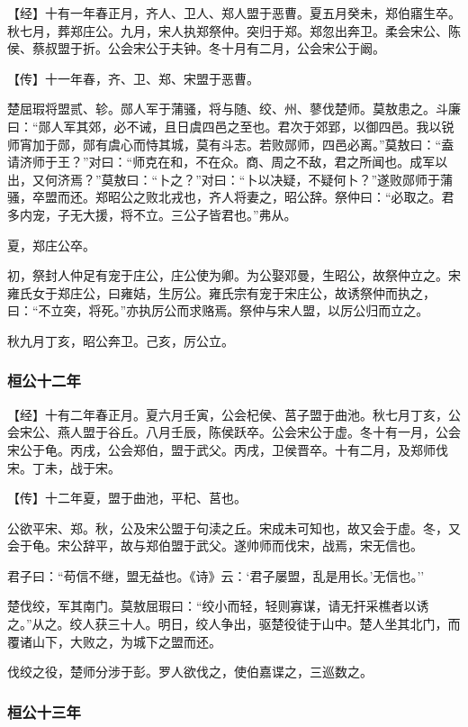 \documentclass[]{article}
\begin{document}
【经】十有一年春正月，齐人、卫人、郑人盟于恶曹。夏五月癸未，郑伯寤生卒。秋七月，葬郑庄公。九月，宋人执郑祭仲。突归于郑。郑忽出奔卫。柔会宋公、陈侯、蔡叔盟于折。公会宋公于夫钟。冬十月有二月，公会宋公于阚。

【传】十一年春，齐、卫、郑、宋盟于恶曹。

楚屈瑕将盟贰、轸。郧人军于蒲骚，将与随、绞、州、蓼伐楚师。莫敖患之。斗廉曰：``郧人军其郊，必不诫，且日虞四邑之至也。君次于郊郢，以御四邑。我以锐师宵加于郧，郧有虞心而恃其城，莫有斗志。若败郧师，四邑必离。''莫敖曰：``盍请济师于王？''对曰：``师克在和，不在众。商、周之不敌，君之所闻也。成军以出，又何济焉？''莫敖曰：``卜之？''对曰：``卜以决疑，不疑何卜？''遂败郧师于蒲骚，卒盟而还。郑昭公之败北戎也，齐人将妻之，昭公辞。祭仲曰：``必取之。君多内宠，子无大援，将不立。三公子皆君也。''弗从。

夏，郑庄公卒。

初，祭封人仲足有宠于庄公，庄公使为卿。为公娶邓曼，生昭公，故祭仲立之。宋雍氏女于郑庄公，曰雍姞，生厉公。雍氏宗有宠于宋庄公，故诱祭仲而执之，曰：``不立突，将死。''亦执厉公而求赂焉。祭仲与宋人盟，以厉公归而立之。

秋九月丁亥，昭公奔卫。己亥，厉公立。

\hypertarget{header-n281}{%
\subsubsection{桓公十二年}\label{header-n281}}

【经】十有二年春正月。夏六月壬寅，公会杞侯、莒子盟于曲池。秋七月丁亥，公会宋公、燕人盟于谷丘。八月壬辰，陈侯跃卒。公会宋公于虚。冬十有一月，公会宋公于龟。丙戌，公会郑伯，盟于武父。丙戌，卫侯晋卒。十有二月，及郑师伐宋。丁未，战于宋。

【传】十二年夏，盟于曲池，平杞、莒也。

公欲平宋、郑。秋，公及宋公盟于句渎之丘。宋成未可知也，故又会于虚。冬，又会于龟。宋公辞平，故与郑伯盟于武父。遂帅师而伐宋，战焉，宋无信也。

君子曰：``苟信不继，盟无益也。《诗》云：`君子屡盟，乱是用长。'无信也。''

楚伐绞，军其南门。莫敖屈瑕曰：``绞小而轻，轻则寡谋，请无扞采樵者以诱之。''从之。绞人获三十人。明日，绞人争出，驱楚役徒于山中。楚人坐其北门，而覆诸山下，大败之，为城下之盟而还。

伐绞之役，楚师分涉于彭。罗人欲伐之，使伯嘉谍之，三巡数之。

\hypertarget{header-n290}{%
\subsubsection{桓公十三年}\label{header-n290}}
\end{document}
